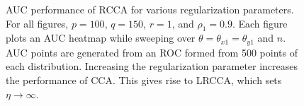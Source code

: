 \begin{figure}[h!]
  \centering
  \caption{AUC performance of RCCA for various regularization parameters. For all figures, $p=100$,
    $q=150$, $r=1$, and $\rho_1=0.9$. Each figure plots an AUC heatmap while sweeping over
  $\theta=\theta_{x1}=\theta_{y1}$ and $n$. AUC points are generated from an ROC formed
  from 500 points of each distribution. Increasing the regularization parameter increases
  the performance of CCA. This gives rise to LRCCA, which sets $\eta\to\infty$.}
  \label{fig:chpt6:rcca}
\end{figure}


